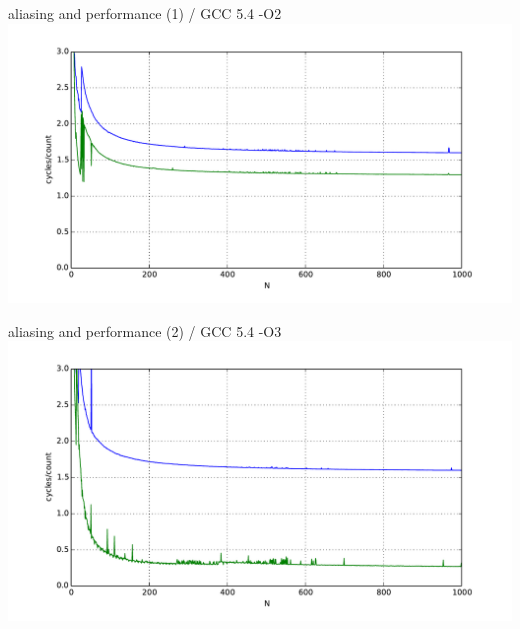 \begin{frame}{aliasing and performance (1) / GCC 5.4 -O2}
    \includegraphics[height=0.8\textheight]{../optimization/sumrows-vary-novect}
\end{frame}

\begin{frame}{aliasing and performance (2) / GCC 5.4 -O3}
    \includegraphics[height=0.8\textheight]{../optimization/sumrows-vary-vect}
\end{frame}
